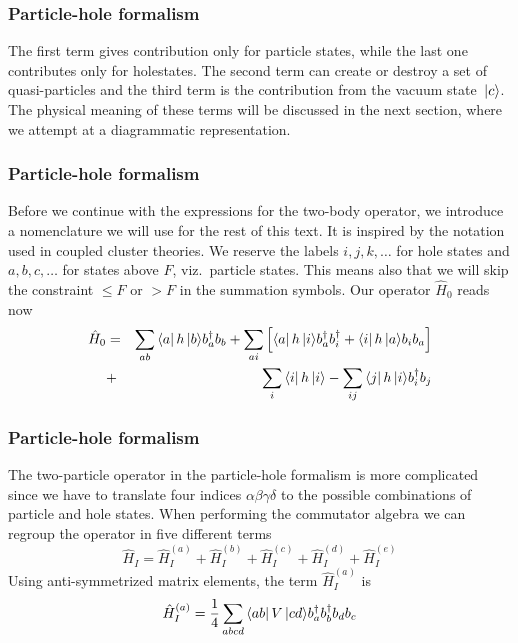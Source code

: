 \frame
{
  \frametitle{Particle-hole formalism}
\begin{small}
{\scriptsize
The first term  gives contribution only for particle states, while the last one
contributes only for holestates. The second term can create or destroy a set of
quasi-particles and 
the third term is the contribution  from the vacuum state $\,|{c}\rangle$.
The physical meaning
of these terms  will be discussed in the next section, where we attempt at a diagrammatic
representation. 
}
\end{small}
}
\frame
{
  \frametitle{Particle-hole formalism}
\begin{small}
{\scriptsize
Before we continue with the expressions for the two-body operator, we introduce a nomenclature we will use for the rest of this
text. It is inspired by the notation used in coupled cluster theories.
We reserve the labels $i,j,k,\dots$ for hole states and $a,b,c,\dots$ for states above $F$, viz.~particle states.
This means also that we will skip the constraint $\leq F$ or $> F$ in the summation symbols. 
Our operator $\hat{H}_0$  reads now 
\begin{eqnarray}
	\hat{H}_0 &=& \sum_{ab} \element{a}{h}{b}  b_a^\dagger b_b +
		\sum_{ai} \left[
		\element{a}{h}{i} b_a^\dagger b_i^\dagger + 
		\element{i}{h}{a} b_i  b_a \right] \nonumber \\
	&+& \sum_{i} \element{i}{h}{i} - 
		\sum_{ij} \element{j}{h}{i}
		b_i^\dagger b_j \label{eq:2-63b}
\end{eqnarray} 
}
\end{small}
}
\frame
{
  \frametitle{Particle-hole formalism}
\begin{small}
{\scriptsize
The two-particle operator in the particle-hole formalism  is more complicated since we have
to translate four indices $\alpha\beta\gamma\delta$ to the possible combinations of particle and hole
states.  When performing the commutator algebra we can regroup the operator in five different terms
\begin{equation}
	\hat{H}_I = \hat{H}_I^{(a)} + \hat{H}_I^{(b)} + \hat{H}_I^{(c)} + \hat{H}_I^{(d)} + \hat{H}_I^{(e)} \label{eq:2-65}
\end{equation}
Using anti-symmetrized  matrix elements, 
the term  $\hat{H}_I^{(a)}$ is  
\begin{equation}
	\hat{H}_I^{(a)} = \frac{1}{4}
	\sum_{abcd} \element{ab}{V}{cd} 
		b_a^\dagger b_b^\dagger b_d b_c \label{eq:2-66}
\end{equation}
}
\end{small}
}
\frame
